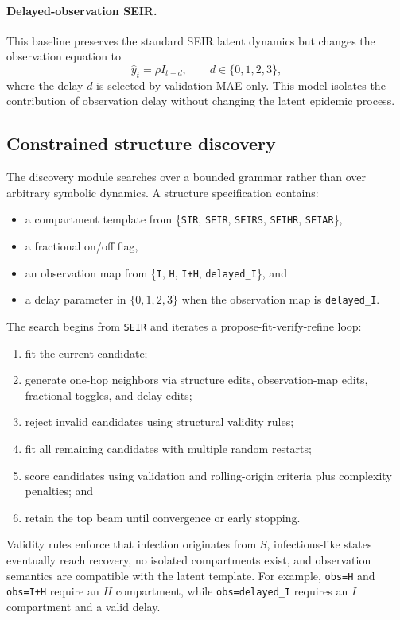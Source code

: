 \paragraph{Delayed-observation SEIR.}
This baseline preserves the standard SEIR latent dynamics but changes the
observation equation to
\[
\hat{y}_t = \rho I_{t-d}, \qquad d \in \{0,1,2,3\},
\]
where the delay $d$ is selected by validation MAE only. This model isolates the
contribution of observation delay without changing the latent epidemic process.

\subsection{Constrained structure discovery}

The discovery module searches over a bounded grammar rather than over arbitrary
symbolic dynamics. A structure specification contains:
\begin{itemize}[leftmargin=1.5em]
\item a compartment template from
\{\texttt{SIR}, \texttt{SEIR}, \texttt{SEIRS}, \texttt{SEIHR}, \texttt{SEIAR}\},
\item a fractional on/off flag,
\item an observation map from
\{\texttt{I}, \texttt{H}, \texttt{I+H}, \texttt{delayed\_I}\}, and
\item a delay parameter in $\{0,1,2,3\}$ when the observation map is
\texttt{delayed\_I}.
\end{itemize}

The search begins from \texttt{SEIR} and iterates a
propose-fit-verify-refine loop:
\begin{enumerate}[leftmargin=1.5em]
\item fit the current candidate;
\item generate one-hop neighbors via structure edits, observation-map edits,
fractional toggles, and delay edits;
\item reject invalid candidates using structural validity rules;
\item fit all remaining candidates with multiple random restarts;
\item score candidates using validation and rolling-origin criteria plus
complexity penalties; and
\item retain the top beam until convergence or early stopping.
\end{enumerate}

Validity rules enforce that infection originates from $S$, infectious-like
states eventually reach recovery, no isolated compartments exist, and
observation semantics are compatible with the latent template. For example,
\texttt{obs=H} and \texttt{obs=I+H} require an $H$ compartment, while
\texttt{obs=delayed\_I} requires an $I$ compartment and a valid delay.

